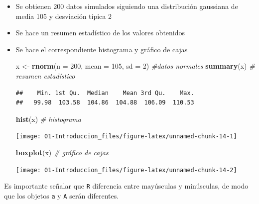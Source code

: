 \documentclass[]{book}
\newenvironment{Shaded}{\begin{snugshade}}{\end{snugshade}}
\newcommand{\KeywordTok}[1]{\textcolor[rgb]{0.13,0.29,0.53}{\textbf{#1}}}
\newcommand{\DataTypeTok}[1]{\textcolor[rgb]{0.13,0.29,0.53}{#1}}
\newcommand{\DecValTok}[1]{\textcolor[rgb]{0.00,0.00,0.81}{#1}}
\newcommand{\StringTok}[1]{\textcolor[rgb]{0.31,0.60,0.02}{#1}}
\newcommand{\CommentTok}[1]{\textcolor[rgb]{0.56,0.35,0.01}{\textit{#1}}}
\newcommand{\NormalTok}[1]{#1}
\begin{document}
\begin{itemize}
\item
  Se obtienen 200 datos simulados siguiendo una distribución gaussiana
  de media 105 y desviación típica 2
\item
  Se hace un resumen estadístico de los valores obtenidos
\item
  Se hace el correspondiente histograma y gráfico de cajas

\begin{Shaded}
\begin{Highlighting}[]
\NormalTok{x <-}\StringTok{ }\KeywordTok{rnorm}\NormalTok{(}\DataTypeTok{n =} \DecValTok{200}\NormalTok{, }\DataTypeTok{mean =} \DecValTok{105}\NormalTok{, }\DataTypeTok{sd =} \DecValTok{2}\NormalTok{) }\CommentTok{#datos normales}
\KeywordTok{summary}\NormalTok{(x) }\CommentTok{# resumen estadístico}
\end{Highlighting}
\end{Shaded}

\begin{verbatim}
##    Min. 1st Qu.  Median    Mean 3rd Qu.    Max. 
##   99.98  103.58  104.86  104.88  106.09  110.53
\end{verbatim}

\begin{Shaded}
\begin{Highlighting}[]
\KeywordTok{hist}\NormalTok{(x) }\CommentTok{# histograma}
\end{Highlighting}
\end{Shaded}

  \begin{center}\texttt{[image: 01-Introduccion\_files/figure-latex/unnamed-chunk-14-1]} \end{center}

\begin{Shaded}
\begin{Highlighting}[]
\KeywordTok{boxplot}\NormalTok{(x) }\CommentTok{# gráfico de cajas}
\end{Highlighting}
\end{Shaded}

  \begin{center}\texttt{[image: 01-Introduccion\_files/figure-latex/unnamed-chunk-14-2]} \end{center}
\end{itemize}

Es importante señalar que \texttt{R} diferencia entre mayúsculas y
minúsculas, de modo que los objetos \texttt{a} y \texttt{A} serán
diferentes.
\end{document}
